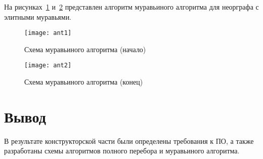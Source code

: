 На рисунках~\ref{fig:ant1} и~\ref{fig:ant2} представлен алгоритм муравьиного алгоритма для неорграфа с элитными муравьями.

\begin{figure}[h]
	\centering
	\texttt{[image: ant1]}
	\caption{Схема муравьиного алгоритма (начало)}
	\label{fig:ant1}
\end{figure}

\begin{figure}[h]
	\centering
	\texttt{[image: ant2]}
	\caption{Схема муравьиного алгоритма (конец)}
	\label{fig:ant2}
\end{figure}

\clearpage

\section{Вывод}

В результате конструкторской части были определены требования к ПО, а также разработаны схемы алгоритмов полного перебора и муравьиного алгоритма.

\clearpage
